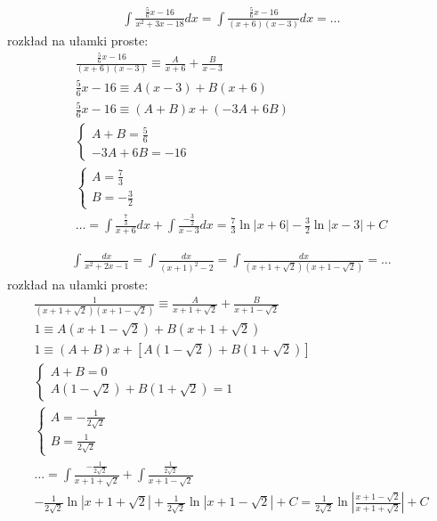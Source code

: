 
\begin{gather*}\int \frac{\frac{5}{6}x-16}{x^2+3x-18}dx = \int \frac{\frac{5}{6}x-16}{(x+6)(x-3)}dx = \ldots\end{gather*}
rozkład na ułamki proste:
\begin{gather*}\frac{\frac{5}{6}x-16}{(x+6)(x-3)} \equiv \frac{A}{x+6}+\frac{B}{x-3} \\
\frac{5}{6}x-16 \equiv A(x-3)+B(x+6) \\
\frac{5}{6}x-16 \equiv (A+B)x+(-3A+6B) \\
\begin{cases} A+B=\frac{5}{6} \\ -3A+6B=-16 \end{cases} \\
\begin{cases} A=\frac{7}{3} \\ B=-\frac{3}{2} \end{cases} \\
\ldots = \int \frac{\frac{7}{3}}{x+6}dx + \int \frac{-\frac{3}{2}}{x-3}dx = \frac{7}{3}\ln|x+6|-\frac{3}{2}\ln|x-3|+C\end{gather*}



\begin{gather*}\int \frac{dx}{x^2+2x-1} = \int \frac{dx}{(x+1)^2-2} = \int \frac{dx}{(x+1+\sqrt{2})(x+1-\sqrt{2})} =\ldots\end{gather*}
rozkład na ułamki proste:
\begin{gather*}\frac{1}{(x+1+\sqrt{2})(x+1-\sqrt{2})} \equiv \frac{A}{x+1+\sqrt{2}}+\frac{B}{x+1-\sqrt{2}} \\
1 \equiv A(x+1-\sqrt{2})+B(x+1+\sqrt{2}) \\
1 \equiv (A+B)x+[A(1-\sqrt{2})+B(1+\sqrt{2})] \\
\begin{cases} A+B=0 \\ A(1-\sqrt{2})+B(1+\sqrt{2})=1 \end{cases} \\
\begin{cases} A=-\frac{1}{2\sqrt{2}} \\ B=\frac{1}{2\sqrt{2}} \end{cases} \\
\ldots = \int \frac{-\frac{1}{2\sqrt{2}}}{x+1+\sqrt{2}} + \int \frac{\frac{1}{2\sqrt{2}}}{x+1-\sqrt{2}} \\
 -\frac{1}{2\sqrt{2}}\ln|x+1+\sqrt{2}|+\frac{1}{2\sqrt{2}}\ln|x+1-\sqrt{2}|+C = \frac{1}{2\sqrt{2}}\ln\left|\frac{x+1-\sqrt{2}}{x+1+\sqrt{2}}\right|+C\end{gather*}


